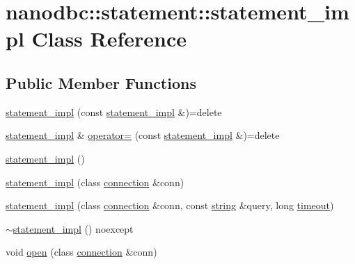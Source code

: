 \hypertarget{classnanodbc_1_1statement_1_1statement__impl}{}\section{nanodbc\+::statement\+::statement\+\_\+impl Class Reference}
\label{classnanodbc_1_1statement_1_1statement__impl}
\subsection*{Public Member Functions}
\begin{DoxyCompactItemize}
\item 
\mbox{\hyperlink{classnanodbc_1_1statement_1_1statement__impl_aa735913b503772797ab41558fd00ab90}{statement\+\_\+impl}} (const \mbox{\hyperlink{classnanodbc_1_1statement_1_1statement__impl}{statement\+\_\+impl}} \&)=delete
\item 
\mbox{\hyperlink{classnanodbc_1_1statement_1_1statement__impl}{statement\+\_\+impl}} \& \mbox{\hyperlink{classnanodbc_1_1statement_1_1statement__impl_ae475a1c248c6639fac18b1cb7075e232}{operator=}} (const \mbox{\hyperlink{classnanodbc_1_1statement_1_1statement__impl}{statement\+\_\+impl}} \&)=delete
\item 
\mbox{\hyperlink{classnanodbc_1_1statement_1_1statement__impl_a948f4c6790c7f5cbbe2cae7681522907}{statement\+\_\+impl}} ()
\item 
\mbox{\hyperlink{classnanodbc_1_1statement_1_1statement__impl_af6e417a2d908b8d7aa8e243097560a42}{statement\+\_\+impl}} (class \mbox{\hyperlink{classnanodbc_1_1connection}{connection}} \&conn)
\item 
\mbox{\hyperlink{classnanodbc_1_1statement_1_1statement__impl_aeb976ed1c29dc5325bd00034033e0967}{statement\+\_\+impl}} (class \mbox{\hyperlink{classnanodbc_1_1connection}{connection}} \&conn, const \mbox{\hyperlink{namespacenanodbc_abfc0ece56278e590911ec8352774c212}{string}} \&query, long \mbox{\hyperlink{classnanodbc_1_1statement_1_1statement__impl_abccb352dfb3ba5143c049017062b9dbd}{timeout}})
\item 
\mbox{\hyperlink{classnanodbc_1_1statement_1_1statement__impl_aa0ca07d54d4e8368bcd244f069347128}{$\sim$statement\+\_\+impl}} () noexcept
\item 
void \mbox{\hyperlink{classnanodbc_1_1statement_1_1statement__impl_a255fc9eb5a4ded633b7ee24fbf45a957}{open}} (class \mbox{\hyperlink{classnanodbc_1_1connection}{connection}} \&conn)
\item 

\end{DoxyCompactItemize}
